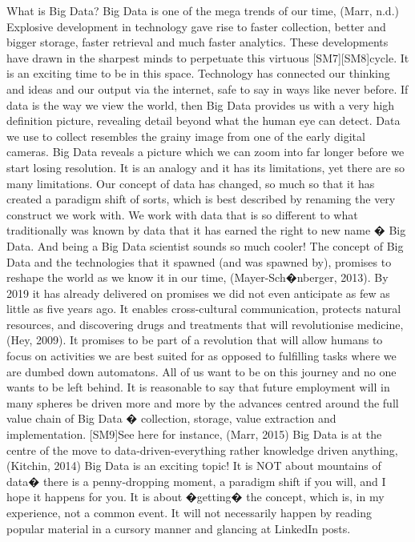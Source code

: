 What is Big Data?
Big Data is one of the mega trends of our time, (Marr, n.d.)
Explosive development in technology gave rise to faster collection, better and bigger storage, faster retrieval and much faster analytics.  These developments have drawn in the sharpest minds to perpetuate this virtuous [SM7][SM8]cycle.  It is an exciting time to be in this space.  Technology has connected our thinking and ideas and our output via the internet, safe to say in ways like never before.
If data is the way we view the world, then Big Data provides us with a very high definition picture, revealing detail beyond what the human eye can detect.   Data we use to collect resembles the grainy image from one of the early digital cameras.  Big Data reveals a picture which we can zoom into far longer before we start losing resolution.  It is an analogy and it has its limitations, yet there are so many limitations. 
Our concept of data has changed, so much so that it has created a paradigm shift of sorts, which is best described by renaming the very construct we work with.  We work with data that is so different to what traditionally was known by data that it has earned the right to new name � Big Data.  And being a Big Data scientist sounds so much cooler!
The concept of Big Data and the technologies that it spawned (and was spawned by), promises to reshape the world as we know it in our time, (Mayer-Sch�nberger, 2013). By 2019 it has already delivered on promises we did not even anticipate as few as little as five years ago.  It enables cross-cultural communication, protects natural resources, and discovering drugs and treatments that will revolutionise medicine,  (Hey, 2009). It promises to be part of a revolution that will allow humans to focus on activities we are best suited for as opposed to fulfilling tasks where we are dumbed down automatons.   All of us want to be on this journey and no one wants to be left behind.  It is reasonable to say that future employment will in many spheres be driven more and more by the advances centred around the full value chain of Big Data � collection, storage, value extraction and implementation. [SM9]See here for instance, (Marr, 2015)   Big Data is at the centre of the move to data-driven-everything rather knowledge driven anything, (Kitchin, 2014)
Big Data is an exciting topic!  It is NOT about mountains of data�  there is a penny-dropping moment, a paradigm shift if you will, and I hope it happens for you.  It is about �getting� the concept, which is, in my experience, not a common event.  It will not necessarily happen by reading popular material in a cursory manner and glancing at LinkedIn posts. 
